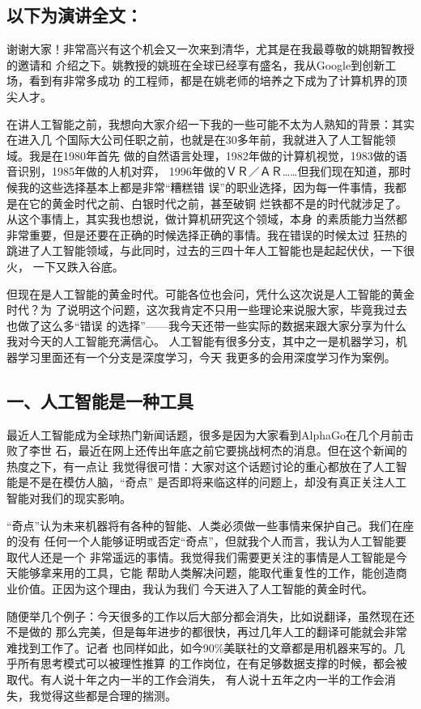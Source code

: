 \documentclass[11pt]{ctexart}
\begin{document}
{{{{\subsection{以下为演讲全文：}
\label{sec:org6c98db0}

谢谢大家！非常高兴有这个机会又一次来到清华，尤其是在我最尊敬的姚期智教授的邀请和
介绍之下。姚教授的姚班在全球已经享有盛名，我从Google到创新工场，看到有非常多成功
的工程师，都是在姚老师的培养之下成为了计算机界的顶尖人才。

在讲人工智能之前，我想向大家介绍一下我的一些可能不太为人熟知的背景：其实在进入几
个国际大公司任职之前，也就是在30多年前，我就进入了人工智能领域。我是在1980年首先
做的自然语言处理，1982年做的计算机视觉，1983做的语音识别，1985年做的人机对弈，
1996年做的ＶＲ／ＡＲ……但我们现在知道，那时候我的这些选择基本上都是非常“糟糕错
误”的职业选择，因为每一件事情，我都是在它的黄金时代之前、白银时代之前，甚至破铜
烂铁都不是的时代就涉足了。从这个事情上，其实我也想说，做计算机研究这个领域，本身
的素质能力当然都非常重要，但是还要在正确的时候选择正确的事情。我在错误的时候太过
狂热的跳进了人工智能领域，与此同时，过去的三四十年人工智能也是起起伏伏，一下很火，
一下又跌入谷底。

但现在是人工智能的黄金时代。可能各位也会问，凭什么这次说是人工智能的黄金时代？为
了说明这个问题，这次我肯定不只用一些理论来说服大家，毕竟我过去也做了这么多“错误
的选择”——我今天还带一些实际的数据来跟大家分享为什么我对今天的人工智能充满信心。
人工智能有很多分支，其中之一是机器学习，机器学习里面还有一个分支是深度学习，今天
我更多的会用深度学习作为案例。
\subsection{一、人工智能是一种工具}
\label{sec:org691d505}
最近人工智能成为全球热门新闻话题，很多是因为大家看到AlphaGo在几个月前击败了李世
石，最近在网上还传出年底之前它要挑战柯杰的消息。但在这个新闻的热度之下，有一点让
我觉得很可惜：大家对这个话题讨论的重心都放在了人工智能是不是在模仿人脑，“奇点”
是否即将来临这样的问题上，却没有真正关注人工智能对我们的现实影响。

“奇点”认为未来机器将有各种的智能、人类必须做一些事情来保护自己。我们在座的没有
任何一个人能够证明或否定“奇点”，但就我个人而言，我认为人工智能要取代人还是一个
非常遥远的事情。我觉得我们需要更关注的事情是人工智能是今天能够拿来用的工具，它能
帮助人类解决问题，能取代重复性的工作，能创造商业价值。正因为这个理由，我认为我们
今天进入了人工智能的黄金时代。

随便举几个例子：今天很多的工作以后大部分都会消失，比如说翻译，虽然现在还不是做的
那么完美，但是每年进步的都很快，再过几年人工的翻译可能就会非常难找到工作了。记者
也同样如此，如今90\%美联社的文章都是用机器来写的。几乎所有思考模式可以被理性推算
的工作岗位，在有足够数据支撑的时候，都会被取代。有人说十年之内一半的工作会消失，
有人说十五年之内一半的工作会消失，我觉得这些都是合理的揣测。

}}}}
\end{document}
